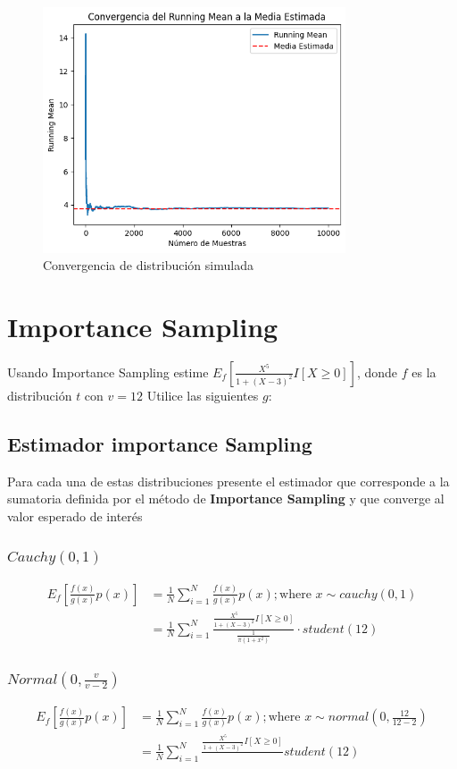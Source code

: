 \documentclass{article}
\begin{document}
\begin{figure}[H]
	\centering
	\includegraphics[width=0.8\textwidth]{assets/gama_sum.png}
	\caption{Convergencia de distribución simulada}
\end{figure}

\section{Importance Sampling}

Usando Importance Sampling estime $E_f\left[ \frac{X^5}{1+(X - 3)^2}I[X \ge 0] \right]$, donde $f$ es la
distribución $t$ con $v=12$ Utilice las siguientes $g$:

\subsection{Estimador importance Sampling}
Para cada una de estas distribuciones presente el estimador que corresponde a la sumatoria definida
por el método de \textbf{Importance Sampling} y que converge al valor esperado de interés
\subsubsection{$Cauchy(0,1)$}
\[
	\begin{split}
		E_f\left[\frac{f(x)}{g(x)}p(x)\right] & = \frac{1}{N}\sum_{i=1}^{N}\frac{f(x)}{g(x)}p(x) ; \text{where } x \sim cauchy(0,1)                             \\
		                                      & = \frac{1}{N}\sum_{i=1}^{N}\frac{\frac{X^5}{1+(X - 3)^2}I[X \ge 0] }{\frac{1}{\pi (1 + x^2)}} \cdot student(12)
	\end{split}
\]
\subsubsection{$Normal(0, \frac{v}{v-2})$}
\[
	\begin{split}
		E_f\left[\frac{f(x)}{g(x)}p(x)\right] & = \frac{1}{N}\sum_{i=1}^{N}\frac{f(x)}{g(x)}p(x) ; \text{where } x \sim normal(0,\frac{12}{12-2}) \\
		                                      & = \frac{1}{N}\sum_{i=1}^{N}\frac{\frac{X^5}{1+(X - 3)^2}I[X \ge 0] }{}student(12)
	\end{split}
\]
\end{document}
